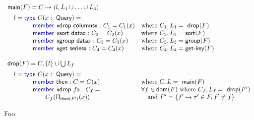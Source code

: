 \documentclass[a4paper,UKenglish]{lipics-v2016}
\theoremstyle{plain}
\theoremstyle{definition}
\newcommand{\kvd}[1]{\textnormal{\textcolor{kvdclr}{\sffamily #1}}}
\newcommand{\ident}[1]{\textnormal{\sffamily #1}}
\newcommand{\qident}[1]{\textnormal{\sffamily \guillemotleft #1\guillemotright}}
\newcommand{\dom}{\ident{dom}}
\begin{document}
\newpage


\begin{figure}
\begin{equation*}
\begin{array}{ll}
\ident{main}(F) = C \mapsto (l, L_1 \cup \ldots \cup L_4)\\[0.5em]
\quad l = \kvd{type}~C(x:\ident{Query}) = \\
\qquad \qquad \kvd{member}~\qident{drop columns} : C_1 = C_1(x) &\textnormal{where}~C_1, L_1 = \ident{drop}(F)\\
\qquad \qquad \kvd{member}~\qident{sort data} : C_2 = C_2(x) &\textnormal{where}~C_2, L_2 = \ident{sort}(F)\\
\qquad \qquad \kvd{member}~\qident{group data} : C_3 = C_3(x) &\textnormal{where}~C_3, L_3 = \ident{group}(F)\\
\qquad \qquad \kvd{member}~\qident{get series} : C_4 = C_4(x) &\textnormal{where}~C_4, L_4 = \ident{get-key}(F)\\
\\
\ident{drop}(F) = C, \{l\} \cup \bigcup L_f\\[0.5em]
\quad l = \kvd{type}~C(x:\ident{Query}) = \\
\qquad \qquad \kvd{member}~\ident{then} : C = C(x)                 &\textnormal{where}~C, L = \ident{main}(F)\\
\qquad \qquad \kvd{member}~\qident{drop $f$} : C_f = &\forall f \in \dom(F)~\textnormal{where}~C_f, L_f = \ident{drop}(F')\\
\qquad \qquad \qquad  C_f(\Pi_{\ident{dom}(F')}(x))& \quad\textnormal{and}~ F' = \{ f'\mapsto\tau'\in F, f' \neq f\}\\
\end{array}
\end{equation*}

\caption{Foo}
\label{fig:foo}
\end{figure}
\end{document}
